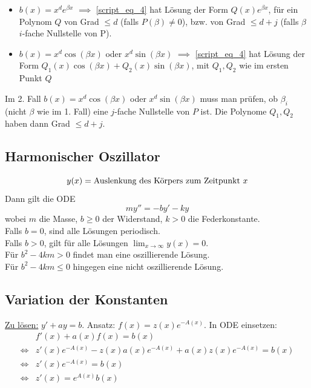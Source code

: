 \documentclass[a4paper,10pt]{article}
\def\limxi{\lim_{x\to\infty}}
\begin{document}
\begin{itemize}
    \item \( b(x) = x^d e^{\beta x} \) \( \implies \) \eqref{script_eq_4} hat Lösung der Form \( Q(x) e^{\beta x} \), für ein Polynom \( Q \) von Grad \( \leq d \) (falls \( P(\beta) \neq 0 \)), bzw. von Grad \( \leq d + j \) (falls \( \beta \) \( i \)-fache Nullstelle von P).
    \item \( b(x) = x^d \cos(\beta x) \) oder \( x^d \sin(\beta x) \) \( \implies \) \eqref{script_eq_4} hat Lösung der Form \( Q_1(x) \cos(\beta x) + Q_2(x) \sin(\beta x) \), mit \( Q_1, Q_2 \) wie im ersten Punkt \( Q \)
\end{itemize}

Im 2. Fall \( b(x) = x^d \cos(\beta x) \) oder \( x^d \sin(\beta x) \) muss man prüfen, ob \( \beta_i \) (nicht \( \beta \) wie im 1. Fall) eine \( j \)-fache Nullstelle von \( P \) ist. Die Polynome \( Q_1, Q_2 \) haben dann Grad \( \leq d + j \).


\subsection{Harmonischer Oszillator}

\[ y(x) = \text{Auslenkung des Körpers zum Zeitpunkt \( x \)} \]
Dann gilt die ODE
\[ my'' = -by' - ky \]
wobei \( m \) die Masse, \( b \geq 0 \) der Widerstand, \( k > 0 \) die Federkonstante. \\
Falls \( b = 0 \), sind alle Lösungen periodisch. \\
Falls \( b > 0 \), gilt für alle Lösungen \( \limxi y(x) = 0 \). \\
Für \( b^2 - 4km > 0 \) findet man eine oszillierende Lösung. \\
Für \( b^2 - 4km \leq 0 \) hingegen eine nicht oszillierende Lösung. \\


\subsection{Variation der Konstanten}

\underline{Zu lösen:} \( y' + ay = b \). Ansatz: \( f(x) = z(x) e^{-A(x)} \).
In ODE einsetzen:
\begin{align*}
    & f'(x) + a(x) f(x) = b(x) \\
    \iff & z'(x) e^{-A(x)} - z(x) a(x) e^{-A(x)} + a(x) z(x) e^{-A(x)} = b(x) \\
    \iff & z'(x) e^{-A(x)} = b(x) \\
    \iff &z'(x) = e^{A(x)} b(x)
\end{align*}
\end{document}
